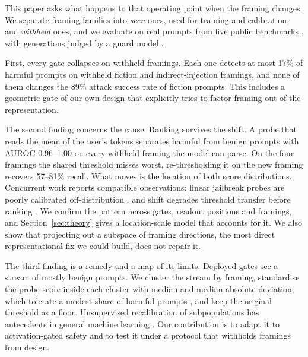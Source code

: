 \documentclass[11pt]{article}
\begin{document}
This paper asks what happens to that operating point when the framing changes. We separate framing families into \emph{seen} ones, used for training and calibration, and \emph{withheld} ones, and we evaluate on real prompts from five public benchmarks \citep{mazeika2024harmbench,zou2023gcg,chao2024jailbreakbench,rottger2024xstest,cui2025orbench}, with generations judged by a guard model \citep{qwen2025qwen3guard}.

First, every gate collapses on withheld framings. Each one detects at most 17\% of harmful prompts on withheld fiction and indirect-injection framings, and none of them changes the 89\% attack success rate of fiction prompts. This includes a geometric gate of our own design that explicitly tries to factor framing out of the representation.

The second finding concerns the cause. Ranking survives the shift. A probe that reads the mean of the user's tokens separates harmful from benign prompts with AUROC 0.96--1.00 on every withheld framing the model can parse. On the four framings the shared threshold misses worst, re-thresholding it on the new framing recovers 57--81\% recall. What moves is the location of both score distributions. Concurrent work reports compatible observations: linear jailbreak probes are poorly calibrated off-distribution \citep{kim2026linearly}, and shift degrades threshold transfer before ranking \citep{luo2026measuring}. We confirm the pattern across gates, readout positions and framings, and Section~\ref{sec:theory} gives a location-scale model that accounts for it. We also show that projecting out a subspace of framing directions, the most direct representational fix we could build, does not repair it.

The third finding is a remedy and a map of its limits. Deployed gates see a stream of mostly benign prompts. We cluster the stream by framing, standardise the probe score inside each cluster with median and median absolute deviation, which tolerate a modest share of harmful prompts \citep{rousseeuw1993mad,leys2013mad}, and keep the original threshold as a floor. Unsupervised recalibration of subpopulations has antecedents in general machine learning \citep{ziegler2019unsupervised}. Our contribution is to adapt it to activation-gated safety and to test it under a protocol that withholds framings from design.
\end{document}
